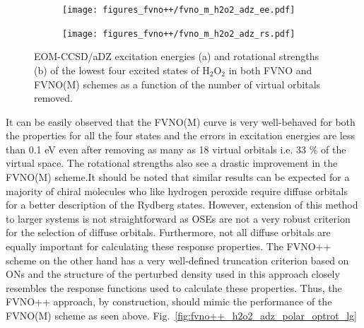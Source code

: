\begin{figure}
\begin{subfigure}{.5\textwidth}
  \centering
  \texttt{[image: figures\_fvno++/fvno\_m\_h2o2\_adz\_ee.pdf]}
  \caption{}
  \label{fig:sfig1}
\end{subfigure}%
\begin{subfigure}{.5\textwidth}
  \centering
  \texttt{[image: figures\_fvno++/fvno\_m\_h2o2\_adz\_rs.pdf]}
  \caption{}
  \label{fig:sfig2}
\end{subfigure}
\caption{{\footnotesize EOM-CCSD/aDZ excitation energies (a) and rotational strengths (b) of the lowest four excited states of H$_2$O$_2$ in both FVNO and FVNO(M) schemes as a function of the number of virtual orbitals removed.}}
\label{fig:fvno_m_h2o2_adz_ee_rs}
\end{figure}
It can be easily observed that the FVNO(M) curve is very well-behaved for 
both the properties for all the four states and the errors in excitation energies are less than 0.1 eV even after removing as many as 18 virtual orbitals i.e. 33 \% of the virtual space. The rotational strengths also see a drastic improvement in the FVNO(M) scheme.It should be noted that similar results can be expected for a majority of chiral molecules who like hydrogen peroxide require diffuse orbitals for a better description of the Rydberg states. However, extension of this method to larger systems is not straightforward as OSEs are not a very robust criterion for the selection of diffuse orbitals. Furthermore, not all diffuse orbitals are equally important for calculating these response properties. The FVNO++ scheme on the other hand has a very well-defined truncation criterion based on ONs and the structure of the perturbed density used in this approach closely resembles the response functions used to calculate these properties. Thus, the FVNO++ approach, by construction, should mimic the performance of the FVNO(M) scheme as seen above. Fig.~\ref{fig:fvno++_h2o2_adz_polar_optrot_lg} 
